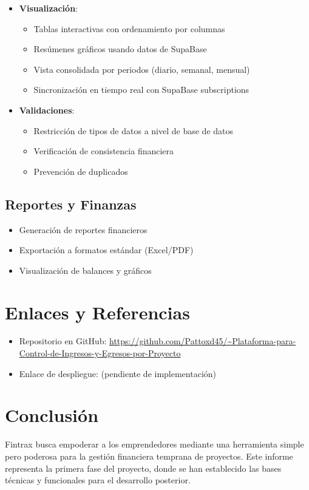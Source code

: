 \begin{itemize}
    \item \textbf{Visualización}:
    \begin{itemize}
        \item Tablas interactivas con ordenamiento por columnas
        \item Resúmenes gráficos usando datos de SupaBase
        \item Vista consolidada por periodos (diario, semanal, mensual)
        \item Sincronización en tiempo real con SupaBase subscriptions
    \end{itemize}
    
    \item \textbf{Validaciones}:
    \begin{itemize}
        \item Restricción de tipos de datos a nivel de base de datos
        \item Verificación de consistencia financiera
        \item Prevención de duplicados
    \end{itemize}
\end{itemize}

\subsection{Reportes y Finanzas}
\begin{itemize}
    \item Generación de reportes financieros
    \item Exportación a formatos estándar (Excel/PDF)
    \item Visualización de balances y gráficos
\end{itemize}

\section{Enlaces y Referencias}
\begin{itemize}
    \item Repositorio en GitHub: \url{https://github.com/Pattoxd45/~Plataforma-para-Control-de-Ingresos-y-Egresos-por-Proyecto}
    \item Enlace de despliegue: (pendiente de implementación)
\end{itemize}

\section{Conclusión}
Fintrax busca empoderar a los emprendedores mediante una herramienta simple pero poderosa para la gestión financiera temprana de proyectos. Este informe representa la primera fase del proyecto, donde se han establecido las bases técnicas y funcionales para el desarrollo posterior.